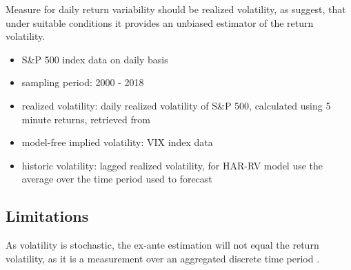 Measure for daily return variability should be realized volatility, as \citeauthor{andersen2001} suggest, that under suitable conditions it provides an unbiased estimator of the return volatility. 


\begin{itemize}\itemsep0pt
\item S\&P 500 index data on daily basis
\item sampling period: 2000 - 2018
\item realized volatility: daily realized volatility of S\&P 500, calculated using 5 minute returns, retrieved from \citeauthor{heber2009}
\item model-free implied volatility: VIX index data
\item historic volatility: lagged realized volatility, for HAR-RV model use the average over the time period used to forecast
\end{itemize}


\subsection{Limitations}
As volatility is stochastic, the ex-ante estimation will not equal the return volatility, as it is a measurement over an aggregated discrete time period \parencite{andersen2001}.
